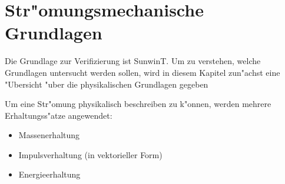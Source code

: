 \newpage
\chapter{Str"omungsmechanische Grundlagen}
Die Grundlage zur Verifizierung ist SunwinT. Um zu verstehen, welche Grundlagen untersucht werden sollen, wird in diesem Kapitel zun"achst eine "Ubersicht "uber die physikalischen Grundlagen gegeben

Um eine Str"omung physikalisch beschreiben zu k"onnen, werden mehrere Erhaltungss"atze angewendet:
\begin{itemize}
	\item Massenerhaltung 
	\item Impulsverhaltung (in vektorieller Form)
	\item Energieerhaltung
\end{itemize}

